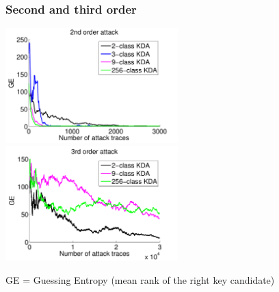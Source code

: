\begin{frame}
\frametitle{Second and third order}
\vspace{-10pt}
\includegraphics[width=0.5\textwidth]{../Figures/CARDIS2016/2order_classes_TA.pdf} 
\includegraphics[width=0.5\textwidth]{../Figures/CARDIS2016/3order_new.pdf}

GE = Guessing Entropy (mean rank of the right key candidate)
\vspace*{15pt}




\end{frame}

